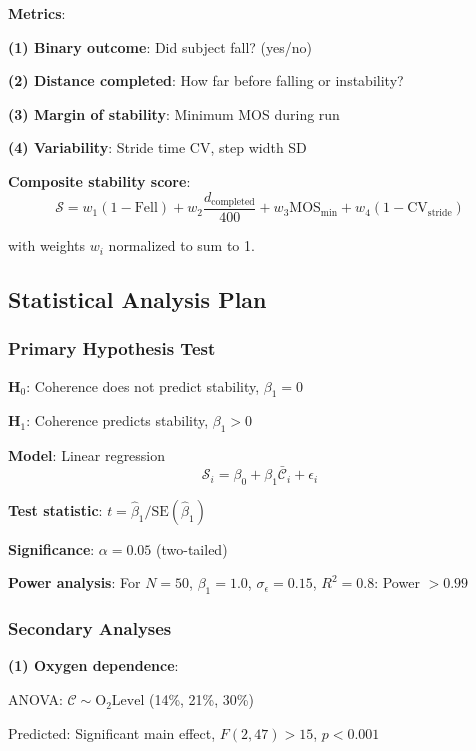 \documentclass[11pt,onecolumn]{article}
\begin{document}
\textbf{Metrics}:

\textbf{(1) Binary outcome}: Did subject fall? (yes/no)

\textbf{(2) Distance completed}: How far before falling or instability?

\textbf{(3) Margin of stability}: Minimum MOS during run

\textbf{(4) Variability}: Stride time CV, step width SD

\textbf{Composite stability score}:
\begin{equation}
\mathcal{S} = w_1(1 - \text{Fell}) + w_2\frac{d_{\text{completed}}}{400} + w_3\text{MOS}_{\min} + w_4(1 - \text{CV}_{\text{stride}})
\end{equation}

with weights $w_i$ normalized to sum to 1.

\subsection{Statistical Analysis Plan}

\subsubsection{Primary Hypothesis Test}

\textbf{H$_0$}: Coherence does not predict stability, $\beta_1 = 0$

\textbf{H$_1$}: Coherence predicts stability, $\beta_1 > 0$

\textbf{Model}: Linear regression
\begin{equation}
\mathcal{S}_i = \beta_0 + \beta_1 \bar{\mathcal{C}}_{i} + \epsilon_i
\end{equation}

\textbf{Test statistic}: $t = \hat{\beta}_1 / \text{SE}(\hat{\beta}_1)$

\textbf{Significance}: $\alpha = 0.05$ (two-tailed)

\textbf{Power analysis}: For $N = 50$, $\beta_1 = 1.0$, $\sigma_\epsilon = 0.15$, $R^2 = 0.8$: Power $> 0.99$

\subsubsection{Secondary Analyses}

\textbf{(1) Oxygen dependence}:

ANOVA: $\mathcal{C} \sim \text{O}_2\text{Level}$ (14\%, 21\%, 30\%)

Predicted: Significant main effect, $F(2, 47) > 15$, $p < 0.001$
\end{document}
